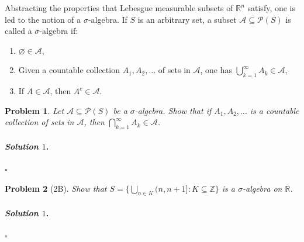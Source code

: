 \documentclass[reqno]{amsart}
\theoremstyle{plain}
\newtheorem{problem}{Problem}
\theoremstyle{definition}
\newenvironment{solution1}{\paragraph{\emph{Solution $1$}.}}{\hfill$\square$}
\begin{document}
Abstracting the properties that Lebesgue measurable subsets of $\mathbb{R}^{n}$ satisfy, one is led to the notion of a $\sigma$-algebra.  If $S$ is an arbitrary set, a subset $\mathcal{A} \subseteq \mathcal{P}(S)$ is called a $\sigma$-algebra if:
\begin{enumerate}
\item $\varnothing \in \mathcal{A}$,
\item Given a countable collection $A_{1},A_{2},\ldots$ of sets in $\mathcal{A}$, one has $\bigcup_{k=1}^{\infty}A_{k} \in \mathcal{A}$,
\item If $A \in \mathcal{A}$, then $A^{c} \in \mathcal{A}$.
\end{enumerate}
 
 
\begin{problem}
Let $\mathcal{A} \subseteq \mathcal{P}(S)$ be a $\sigma$-algebra.  Show that if $A_{1},A_{2},\ldots$ is a countable collection of sets in $\mathcal{A}$, then $\bigcap_{k=1}^{\infty}A_{k} \in \mathcal{A}$.
\end{problem}
\begin{solution1}

\end{solution1} 


\begin{problem}[2B]
Show that $S= \{\bigcup_{n \in K} (n, n+1]: K \subseteq \mathbb{Z} \}$ is a $\sigma$-algebra on $\mathbb{R}$.
\end{problem}
\begin{solution1}

\end{solution1}
\end{document}
